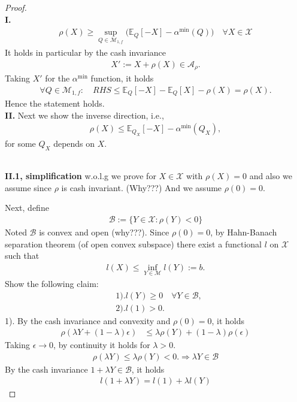 \begin{proof}
\quad\\
\textbf{I.} 
\begin{align*}
	\rho(X) \ge \sup_{Q \in \mathcal{M}_{1, f}} \bigg( \mathbb{E}_Q[-X] - \alpha^{\min} (Q) \bigg)\quad \forall X \in \mathcal{X}
\end{align*}
It holds in particular by the cash invariance
\begin{align*}
	X':= X + \rho(X) \in \mathcal{A}_\rho.
\end{align*}
Taking $X'$ for the $\alpha^{\min}$ function, it holds
\begin{align*}
	\forall Q \in \mathcal{M}_{1, f}: \quad RHS \le  \mathbb{E}_Q[-X] - \mathbb{E}_Q[X] - \rho(X) = \rho(X).
\end{align*}
Hence the statement holds.
\quad\\
\textbf{II.} Next we show the inverse direction, i.e., 
\begin{align*}
	\rho(X) \le \mathbb{E}_{Q_X}[-X] - \alpha^{\min}(Q_X),
\end{align*}
for some $Q_X$ depends on $X$.

\quad\\
\textbf{II.1, simplification} w.o.l.g we prove for $X \in \mathcal{X}$ with $\rho(X) = 0$ and also we assume since $\rho$ is cash invariant. (Why???) And we assume $\rho(0) = 0$. \par 
\quad\par 
Next, define 
\begin{align*}
	\mathcal{B}:= \{ Y \in \mathcal{X}: \rho(Y) < 0\}
\end{align*}
Noted $\mathcal{B}$ is convex and open (why???). Since $\rho(0) = 0$, by Hahn-Banach separation theorem (of open convex subspace) there exist a functional $l$ on $\mathcal{X}$ such that
\begin{align*}
	l(X) \le \inf_{Y \in \mathcal{M}} l(Y):= b. 
\end{align*}
Show the following claim:
\begin{align*}
	& 1). l(Y) \ge 0 \quad \forall Y \in \mathcal{B},\\
	& 2). l(1) > 0. 
\end{align*}
1). By the cash invariance and convexity and $\rho(0) = 0$, it holds
\begin{align*}
	\rho(\lambda Y + (1 - \lambda) \epsilon) & \le \lambda \rho (Y) + ( 1 - \lambda ) \rho(\epsilon) 
\end{align*}
Taking $\epsilon \rightarrow 0$, by continuity it holds for $\lambda > 0$. 
\begin{align*}
	\rho (\lambda Y) \le \lambda \rho(Y) < 0. \Rightarrow \lambda Y \in \mathcal{B}
\end{align*}
By the cash invariance $ 1 + \lambda Y \in \mathcal{B}$, it holds
\begin{align*}
	l( 1 + \lambda Y) = l(1) + \lambda l(Y)
\end{align*}



\end{proof}
